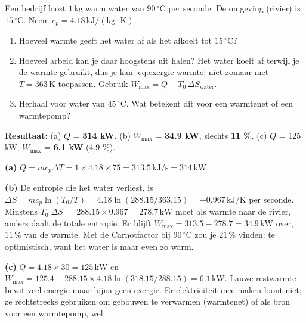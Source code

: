 \begin{oefening}
Een bedrijf loost \(1\,\mathrm{kg}\) warm water van \(90\,^\circ\mathrm{C}\) per seconde. De omgeving (rivier) is \(15\,^\circ\mathrm{C}\). Neem \(c_p = 4.18\,\mathrm{kJ/(kg\cdot K)}\).

\begin{enumerate}
\item[(a)]
  Hoeveel warmte geeft het water af als het afkoelt tot \(15\,^\circ\mathrm{C}\)?
\item[(b)]
  Hoeveel arbeid kan je daar hoogstens uit halen? Het water koelt af terwijl je de warmte gebruikt, dus je kan \eqref{eq:exergie-warmte} niet zomaar met \(T = 363\,\mathrm{K}\) toepassen. Gebruik \(W_{\max} = Q - T_0\,\Delta S_{\text{water}}\).
\item[(c)]
  Herhaal voor water van \(45\,^\circ\mathrm{C}\). Wat betekent dit voor een warmtenet of een warmtepomp?
\end{enumerate}
\end{oefening}
\begin{oplossing}
\textbf{Resultaat:} (a) \(Q\) = \textbf{314 kW}. (b) \(W_{\max}\) = \textbf{34.9 kW}, slechts \textbf{11 \%}. (c) \(Q\) = 125 kW, \(W_{\max}\) = \textbf{6.1 kW} (4.9 \%).

\textbf{(a)} \(Q = m c_p \Delta T = 1 \times 4.18 \times 75 = 313.5\,\mathrm{kJ/s} = 314\,\mathrm{kW}\).

\textbf{(b)} De entropie die het water verliest, is \(\Delta S = m c_p\ln(T_0/T) = 4.18\ln(288.15/363.15) = -0.967\,\mathrm{kJ/K}\) per seconde. Minstens \(T_0|\Delta S| = 288.15 \times 0.967 = 278.7\,\mathrm{kW}\) moet als warmte naar de rivier, anders daalt de totale entropie. Er blijft \(W_{\max} = 313.5 - 278.7 = 34.9\,\mathrm{kW}\) over, \(11\,\%\) van de warmte. Met de Carnotfactor bij \(90\,^\circ\mathrm{C}\) zou je \(21\,\%\) vinden: te optimistisch, want het water is maar even zo warm.

\textbf{(c)} \(Q = 4.18 \times 30 = 125\,\mathrm{kW}\) en \(W_{\max} = 125.4 - 288.15 \times 4.18\ln(318.15/288.15) = 6.1\,\mathrm{kW}\). Lauwe restwarmte bevat veel energie maar bijna geen exergie. Er elektriciteit mee maken loont niet; ze rechtstreeks gebruiken om gebouwen te verwarmen (warmtenet) of als bron voor een warmtepomp, wel.
\end{oplossing}

